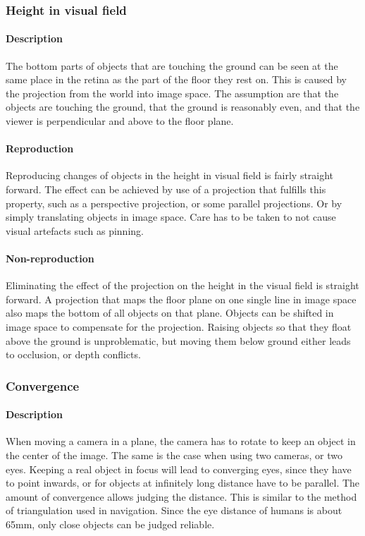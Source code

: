 \subsubsection{Height in visual field}
\paragraph{Description}
The bottom parts of objects that are touching the ground can be seen at the same place in the retina as the part of the floor they rest on. This is caused by the projection from the world into image space. The assumption are that the objects are touching the ground, that the ground is reasonably even, and that the viewer is perpendicular and above to the floor plane.

\paragraph{Reproduction}
Reproducing changes of objects in the height in visual field is fairly straight forward. The effect can be achieved by use of a projection that fulfills this property, such as a perspective projection, or some parallel projections. Or by simply translating objects in image space. Care has to be taken to not cause visual artefacts such as pinning.

\paragraph{Non-reproduction}
Eliminating the effect of the projection on the height in the visual field is straight forward. A projection that maps the floor plane on one single line in image space also maps the bottom of all objects on that plane. Objects can be shifted in image space to compensate for the projection. Raising objects so that they float above the ground is unproblematic, but moving them below ground either leads to occlusion, or depth conflicts.


\subsubsection{Convergence}
\paragraph{Description}
When moving a camera in a plane, the camera has to rotate to keep an object in the center of the image. The same is the case when using two cameras, or two eyes. Keeping a real object in focus will lead to converging eyes, since they have to point inwards, or for objects at infinitely long distance have to be parallel. The amount of convergence allows judging the distance. This is similar to the method of triangulation\cite{triangulation} used in navigation. Since the eye distance of humans is about 65mm, only close objects can be judged reliable.

